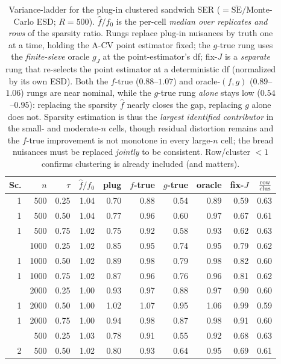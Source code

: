 \begin{table}[t]\centering\small
\caption{Variance-ladder for the plug-in clustered sandwich SER ($=\overline{\mathrm{SE}}/$Monte-Carlo ESD; $R=500$). $\widehat f/f_0$ is the per-cell \emph{median over replicates and rows} of the sparsity ratio. Rungs replace plug-in nuisances by truth one at a time, holding the A-CV point estimator fixed; the $g$-true rung uses the \emph{finite-sieve} oracle $g_J$ at the point-estimator's df; fix-$J$ is a \emph{separate} rung that re-selects the point estimator at a deterministic df (normalized by its own ESD). Both the $f$-true ($0.88$--$1.07$) and oracle-$(f,g)$ ($0.89$--$1.06$) rungs are near nominal, while the $g$-true rung \emph{alone} stays low ($0.54$--$0.95$): replacing the sparsity $\widehat f$ nearly closes the gap, replacing $g$ alone does not. Sparsity estimation is thus the \emph{largest identified contributor} in the small- and moderate-$n$ cells, though residual distortion remains and the $f$-true improvement is not monotone in every large-$n$ cell; the bread nuisances must be replaced \emph{jointly} to be consistent. Row/cluster $<1$ confirms clustering is already included (and matters).}
\label{tab:ladder}\begin{tabular}{rrr r rrrrr r}\toprule
Sc.&$n$&$\tau$&$\widehat f/f_0$&plug&$f$-true&$g$-true&oracle&fix-$J$&$\tfrac{\rm row}{\rm clus}$\\\midrule
1 & 500 & 0.25 & 1.04 & 0.70 & 0.88 & 0.54 & 0.89 & 0.59 & 0.63 \\
1 & 500 & 0.50 & 1.04 & 0.77 & 0.96 & 0.60 & 0.97 & 0.67 & 0.61 \\
1 & 500 & 0.75 & 1.02 & 0.75 & 0.92 & 0.58 & 0.93 & 0.62 & 0.63 \\
\addlinespace
1 & 1000 & 0.25 & 1.02 & 0.85 & 0.95 & 0.74 & 0.95 & 0.79 & 0.62 \\
1 & 1000 & 0.50 & 1.02 & 0.89 & 0.98 & 0.79 & 0.98 & 0.82 & 0.60 \\
1 & 1000 & 0.75 & 1.02 & 0.87 & 0.96 & 0.76 & 0.96 & 0.81 & 0.62 \\
\addlinespace
1 & 2000 & 0.25 & 1.00 & 0.93 & 0.97 & 0.88 & 0.97 & 0.90 & 0.60 \\
1 & 2000 & 0.50 & 1.00 & 1.02 & 1.07 & 0.95 & 1.06 & 0.99 & 0.59 \\
1 & 2000 & 0.75 & 1.00 & 0.94 & 0.98 & 0.87 & 0.98 & 0.91 & 0.60 \\
\addlinespace
2 & 500 & 0.25 & 1.03 & 0.78 & 0.91 & 0.55 & 0.92 & 0.68 & 0.63 \\
2 & 500 & 0.50 & 1.02 & 0.80 & 0.93 & 0.64 & 0.95 & 0.69 & 0.61 \\

\end{tabular}
\end{table}
